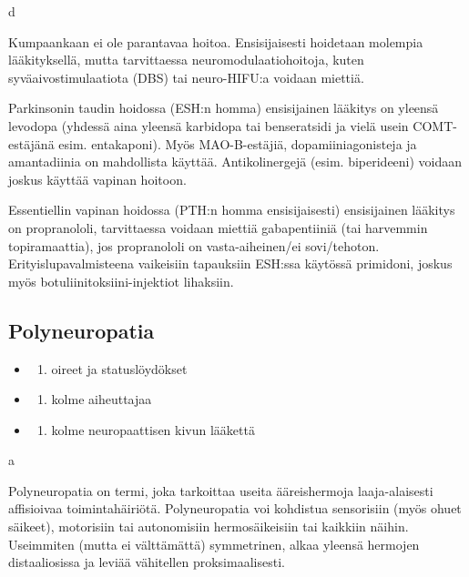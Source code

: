 \documentclass[
]{book}
\providecommand{\tightlist}{%
  \setlength{\itemsep}{0pt}\setlength{\parskip}{0pt}}
\begin{document}
d

Kumpaankaan ei ole parantavaa hoitoa. Ensisijaisesti hoidetaan molempia lääkityksellä, mutta tarvittaessa neuromodulaatiohoitoja, kuten syväaivostimulaatiota (DBS) tai neuro-HIFU:a voidaan miettiä.

Parkinsonin taudin hoidossa (ESH:n homma) ensisijainen lääkitys on yleensä levodopa (yhdessä aina yleensä karbidopa tai benseratsidi ja vielä usein COMT-estäjänä esim. entakaponi). Myös MAO-B-estäjiä, dopamiiniagonisteja ja amantadiinia on mahdollista käyttää. Antikolinergejä (esim. biperideeni) voidaan joskus käyttää vapinan hoitoon.

Essentiellin vapinan hoidossa (PTH:n homma ensisijaisesti) ensisijainen lääkitys on propranololi, tarvittaessa voidaan miettiä gabapentiiniä (tai harvemmin topiramaattia), jos propranololi on vasta-aiheinen/ei sovi/tehoton. Erityislupavalmisteena vaikeisiin tapauksiin ESH:ssa käytössä primidoni, joskus myös botuliinitoksiini-injektiot lihaksiin.

\subsection{Polyneuropatia}\label{polyneuropatia}

\begin{itemize}
\tightlist
\item
  \begin{enumerate}
  \def\labelenumi{\alph{enumi}.}
  \tightlist
  \item
    oireet ja statuslöydökset
  \end{enumerate}
\item
  \begin{enumerate}
  \def\labelenumi{\alph{enumi}.}
  \setcounter{enumi}{1}
  \tightlist
  \item
    kolme aiheuttajaa
  \end{enumerate}
\item
  \begin{enumerate}
  \def\labelenumi{\alph{enumi}.}
  \setcounter{enumi}{2}
  \tightlist
  \item
    kolme neuropaattisen kivun lääkettä
  \end{enumerate}
\end{itemize}

a

Polyneuropatia on termi, joka tarkoittaa useita ääreishermoja laaja-alaisesti affisioivaa toimintahäiriötä. Polyneuropatia voi kohdistua sensorisiin (myös ohuet säikeet), motorisiin tai autonomisiin hermosäikeisiin tai kaikkiin näihin. Useimmiten (mutta ei välttämättä) symmetrinen, alkaa yleensä hermojen distaaliosissa ja leviää vähitellen proksimaalisesti.
\end{document}

